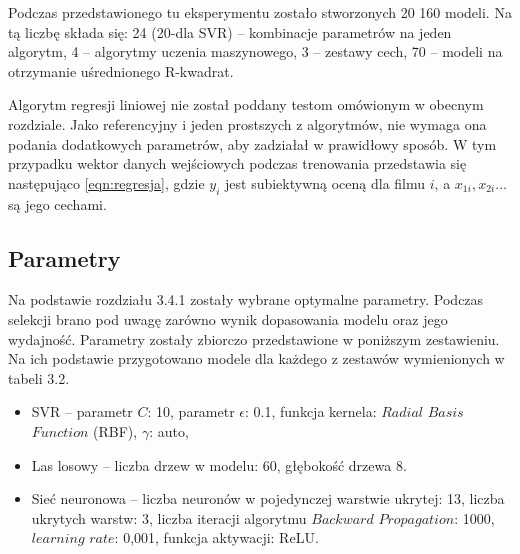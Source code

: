 \vspace{5mm}

Podczas przedstawionego tu eksperymentu zostało stworzonych 20 160 modeli. Na tą liczbę składa się: 24 (20-dla SVR) -- kombinacje parametrów na jeden algorytm, 4 -- algorytmy uczenia maszynowego, 3 -- zestawy cech, 70 -- modeli na otrzymanie uśrednionego R-kwadrat.    

\vspace{5mm}

Algorytm regresji liniowej nie został poddany testom omówionym w obecnym rozdziale. Jako referencyjny i jeden prostszych z algorytmów, nie wymaga ona podania dodatkowych parametrów, aby zadziałał w prawidłowy sposób. W tym przypadku wektor danych wejściowych podczas trenowania przedstawia się  następująco \ref{eqn:regresja}, gdzie $y_i$ jest subiektywną oceną dla filmu $i$, a $x_{1i}, x_{2i}...$ są jego cechami. 

\vspace{7mm}

\subsection{Parametry}


Na podstawie rozdziału 3.4.1 zostały wybrane optymalne parametry. Podczas selekcji brano pod uwagę zarówno wynik dopasowania modelu oraz jego wydajność. Parametry zostały zbiorczo przedstawione w poniższym zestawieniu. Na ich podstawie przygotowano modele dla każdego z zestawów wymienionych w tabeli 3.2.


\begin{itemize}[label=$\bullet$]
	\item SVR --  parametr $C$: 10, parametr $\epsilon$: 0.1, funkcja kernela:  $Radial$ $Basis$ $Function$ (RBF), $\gamma$: auto, 
	
	\item Las losowy -- liczba drzew w modelu: 60, głębokość drzewa 8. 

	\item Sieć neuronowa -- liczba neuronów w pojedynczej warstwie ukrytej: 13, liczba ukrytych warstw: 3, liczba iteracji algorytmu $Backward$ $Propagation$: 1000, $learning$ $rate$: 0,001, funkcja aktywacji: ReLU.\par 
	
\end{itemize}


